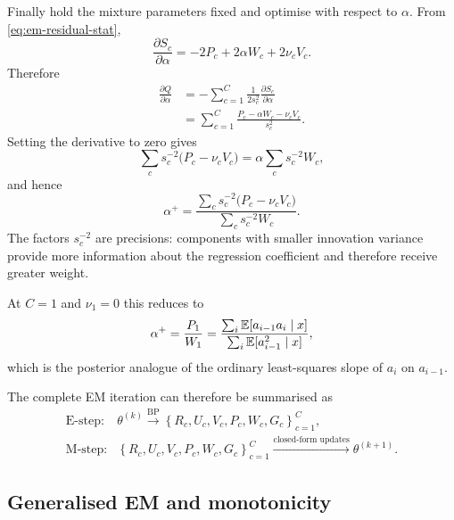 Finally hold the mixture parameters fixed and optimise with respect to
$\alpha$. From \eqref{eq:em-residual-stat},
\begin{equation}
  \frac{\partial S_c}{\partial\alpha}
  =
  -2P_c
  +2\alpha W_c
  +2\nu_cV_c.
\end{equation}
Therefore
\begin{align}
  \frac{\partial Q}{\partial\alpha}
  &=
  -\sum_{c=1}^{C}
  \frac{1}{2s_c^2}
  \frac{\partial S_c}{\partial\alpha}
  \nonumber\\
  &=
  \sum_{c=1}^{C}
  \frac{
    P_c-\alpha W_c-\nu_cV_c
  }{s_c^2}.
  \label{eq:em-alpha-derivative}
\end{align}
Setting the derivative to zero gives
\begin{equation}
  \sum_c
  s_c^{-2}
  \big(
    P_c-\nu_cV_c
  \big)
  =
  \alpha
  \sum_c
  s_c^{-2}W_c,
\end{equation}
and hence
\begin{equation}
  \boxed{
  \alpha^{+}
  =
  \frac{
    \displaystyle
    \sum_c
    s_c^{-2}
    \big(
      P_c-\nu_cV_c
    \big)
  }{
    \displaystyle
    \sum_c
    s_c^{-2}W_c
  }.
  }
  \label{eq:em-mstep-alpha}
\end{equation}
The factors $s_c^{-2}$ are precisions: components with smaller innovation
variance provide more information about the regression coefficient and
therefore receive greater weight.

At $C=1$ and $\nu_1=0$ this reduces to
\begin{equation}
  \alpha^{+}
  =
  \frac{P_1}{W_1}
  =
  \frac{
    \sum_i
    \mathbb{E}[a_{i-1}a_i\mid x]
  }{
    \sum_i
    \mathbb{E}[a_{i-1}^2\mid x]
  },
\end{equation}
which is the posterior analogue of the ordinary least-squares slope of $a_i$
on $a_{i-1}$.

The complete EM iteration can therefore be summarised as
\begin{equation}
  \boxed{
  \begin{array}{ll}
  \text{E-step:}
  &
  \theta^{(k)}
  \xrightarrow{\mathrm{BP}}
  \left\{
    R_c,U_c,V_c,P_c,W_c,G_c
  \right\}_{c=1}^{C},
  \\[2mm]
  \text{M-step:}
  &
  \left\{
    R_c,U_c,V_c,P_c,W_c,G_c
  \right\}_{c=1}^{C}
  \xrightarrow{\text{closed-form updates}}
  \theta^{(k+1)}.
  \end{array}
  }
  \label{eq:em-summary}
\end{equation}

\subsection{Generalised EM and monotonicity}

